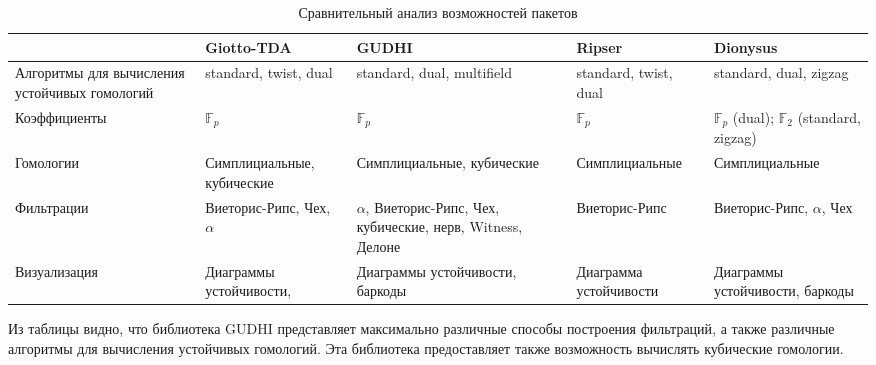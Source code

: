 \begin{table}[!htbp]
	\centering
	\small
	\begin{tabularx}{\linewidth}{|X|X|X|X|X|}
		\hline
		& Giotto-TDA & GUDHI & Ripser& Dionysus\\ \hline
		Алгоритмы для вычисления  устойчивых гомологий & standard, twist, dual& standard, dual, multifield & standard, twist, dual & standard, dual, zigzag \\ \hline
		Коэффициенты & $\mathbb{F}_p$ & $\mathbb{F}_p$ & $\mathbb{F}_p$ & $\mathbb{F}_p$ (dual);  $\mathbb{F}_2$ (standard, zigzag) \\ \hline
		Гомологии & Симплициальные, кубические& Симплициальные, кубические & Симплициальные & Симплициальные \\ \hline
		Фильтрации  & Виеторис-Рипс, Чех, $\alpha$ & $\alpha$, Виеторис-Рипс, Чех, кубические, нерв, Witness, Делоне& Виеторис-Рипс  & Виеторис-Рипс, $\alpha$, Чех\\ \hline
		Визуализация & Диаграммы устойчивости, & Диаграммы устойчивости, баркоды &Диаграмма устойчивости & Диаграммы устойчивости, баркоды \\ \hline
	\end{tabularx}
\caption{Сравнительный анализ возможностей пакетов}	
\label{tabl:packages}
\end{table}

Из таблицы видно, что библиотека GUDHI представляет максимально различные способы построения фильтраций, а также различные алгоритмы для вычисления устойчивых гомологий. Эта библиотека предоставляет также возможность вычислять кубические гомологии.

